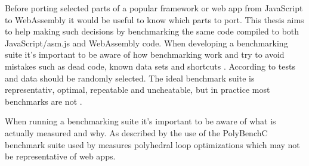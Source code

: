 Before porting selected parts of a popular framework or web app from JavaScript to WebAssembly it would be useful to know which parts to port. This thesis aims to help making such decisions by benchmarking the same code compiled to both JavaScript/asm.js and WebAssembly code. When developing a benchmarking suite it's important to be aware of how benchmarking work and try to avoid mistakes such as dead code, known data sets and shortcuts \parencite{CaiNerurkarWu1998}. According to \textcite{CaiNerurkarWu1998} tests and data should be randomly selected. The ideal benchmark suite is representativ, optimal, repeatable and uncheatable, but in practice most benchmarks are not \parencite{CaiNerurkarWu1998}.

When running a benchmarking suite it's important to be aware of what is actually measured and why. As described by \textcite{JangdaPowersGuhaBerger2019} the use of the PolyBenchC benchmark suite used by \textcite{HaasRossbergSchuffTitzerHolmanGohmanWagnerZakaiBastien2017} measures polyhedral loop optimizations which may not be representative of web apps.

